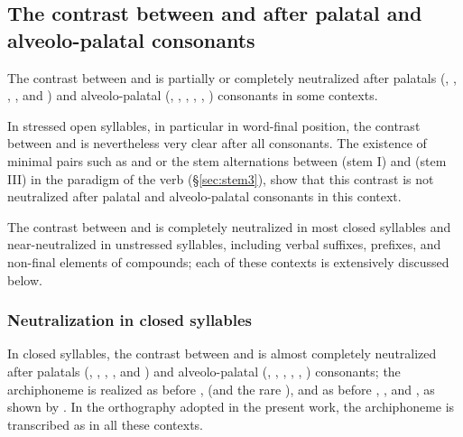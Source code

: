 \subsection{The contrast between  and  after palatal and alveolo-palatal consonants} \label{sec:W.i.contrast}
The contrast between  and  is partially or completely neutralized after palatals (, , , ,  and ) and alveolo-palatal (, , , , , ) consonants in some contexts.

In stressed open syllables, in particular in word-final position, the contrast between  and  is nevertheless very clear after all consonants. The existence of minimal pairs such as  and  or the stem alternations between  (stem I) and  (stem III) in the paradigm of the verb  (§\ref{sec:stem3}), show that this contrast is not neutralized after palatal and alveolo-palatal consonants in this context.

The contrast between  and  is completely neutralized in most closed syllables and near-neutralized in unstressed syllables, including verbal suffixes, prefixes, and non-final elements of compounds; each of these contexts is extensively discussed below.

\subsubsection{Neutralization in closed syllables} \label{sec:W.i.closed.syllables}
In closed syllables, the contrast between  and  is almost completely neutralized after palatals (, , , ,  and ) and alveolo-palatal (, , , , , ) consonants; the archiphoneme   is realized as  before ,  (and the rare ), and as  before , ,  and , as shown by . In the orthography adopted in the present work, the archiphoneme  is transcribed as  in all these contexts.

